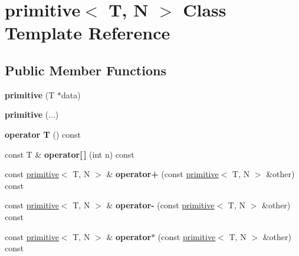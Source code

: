 \hypertarget{classprimitive}{}\section{primitive$<$ T, N $>$ Class Template Reference}
\label{classprimitive}
\subsection*{Public Member Functions}
\begin{DoxyCompactItemize}
\item 
\hypertarget{classprimitive_aa6d523d4980e21bfa1dd61dbef4e9410}{}{\bfseries primitive} (T $\ast$data)\label{classprimitive_aa6d523d4980e21bfa1dd61dbef4e9410}

\item 
\hypertarget{classprimitive_a07fc923d4a50ccf8765ddad066bd39f1}{}{\bfseries primitive} (...)\label{classprimitive_a07fc923d4a50ccf8765ddad066bd39f1}

\item 
\hypertarget{classprimitive_a5d433bc57ad99a4922fed327ccaa9dc1}{}{\bfseries operator T} () const \label{classprimitive_a5d433bc57ad99a4922fed327ccaa9dc1}

\item 
\hypertarget{classprimitive_a895eafeee2d86791fe1f1535cd9a4d6f}{}const T \& {\bfseries operator\mbox{[}$\,$\mbox{]}} (int n) const \label{classprimitive_a895eafeee2d86791fe1f1535cd9a4d6f}

\item 
\hypertarget{classprimitive_a0366cfb005d7935d2e65dc5a6c61c37d}{}const \hyperlink{classprimitive}{primitive}$<$ T, N $>$ \& {\bfseries operator+} (const \hyperlink{classprimitive}{primitive}$<$ T, N $>$ \&other) const \label{classprimitive_a0366cfb005d7935d2e65dc5a6c61c37d}

\item 
\hypertarget{classprimitive_a4801f964d953ee140c14927e3b8c26d0}{}const \hyperlink{classprimitive}{primitive}$<$ T, N $>$ \& {\bfseries operator-\/} (const \hyperlink{classprimitive}{primitive}$<$ T, N $>$ \&other) const \label{classprimitive_a4801f964d953ee140c14927e3b8c26d0}

\item 
\hypertarget{classprimitive_a7c2568ca182b57c7445d90e049ad21b6}{}const \hyperlink{classprimitive}{primitive}$<$ T, N $>$ \& {\bfseries operator$\ast$} (const \hyperlink{classprimitive}{primitive}$<$ T, N $>$ \&other) const \label{classprimitive_a7c2568ca182b57c7445d90e049ad21b6}


\end{DoxyCompactItemize}
